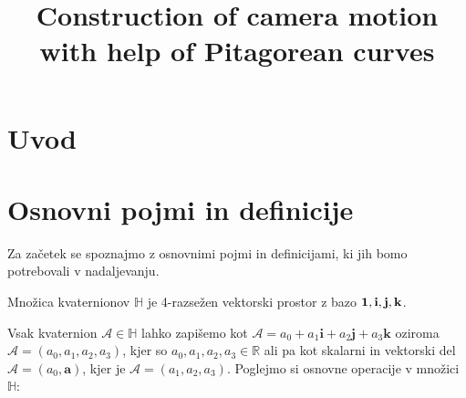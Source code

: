 \documentclass[mat1]{fmfdelo}
\title{Construction of camera motion with help of Pitagorean curves}
\newcommand{\R}{\mathbb R}
\newcommand{\HH}{\mathbb H}
\newcommand{\A}{\mathcal A}
\begin{document}
\section{Uvod}

\section{Osnovni pojmi in definicije}
Za začetek se spoznajmo z osnovnimi pojmi in definicijami, ki jih bomo potrebovali v nadaljevanju.
\begin{definicija}
Množica kvaternionov $\HH$ je 4-razsežen vektorski prostor z bazo $\bf{1},\bf{i},\bf{j},\bf{k}$.
\end{definicija}
Vsak kvaternion $\A \in \HH$ lahko zapišemo kot $\A = a_0 + a_1\mathbf{i} + a_2\mathbf{j} + a_3\mathbf{k}$ oziroma $\A=(a_0,a_1,a_2,a_3)$, kjer so $a_0,a_1,a_2,a_3\in \R$ ali pa kot skalarni in vektorski del $\A =(a_0,\boldsymbol{a})$, kjer je $\A = (a_1,a_2,a_3)$.
Poglejmo si osnovne operacije v množici $\HH$:\\
\end{document}
